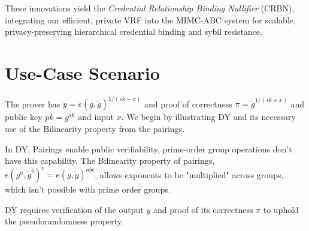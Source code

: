 These innovations yield the \emph{Credential Relationship Binding Nullifier} (CRBN), integrating our efficient, private VRF into the MIMC-ABC system for scalable, privacy-preserving hierarchical credential binding and sybil resistance.






\section{Use-Case Scenario}

The prover has $y = e(g,\tilde{g})^{1/(sk+x)}$ and proof of correctness $\pi = \tilde{g}^{1/(sk+x)}$ and public key $pk = g^{sk}$ and input $x$. We begin by illustrating DY and its necessary use of the Bilinearity property from the pairings.

In DY, Pairings enable public verifiability, prime-order group operations don't have this capability. The Bilinearity property of pairings, $e(g^a,\tilde{g}^b)^c = e(g,\tilde{g})^{abc}$, allows exponents to be "multiplied" across groups, which isn't possible with prime order groups. 

DY requires verification of the output $y$ and proof of its correctness $\pi$ to uphold the pseudorandomness property. 

